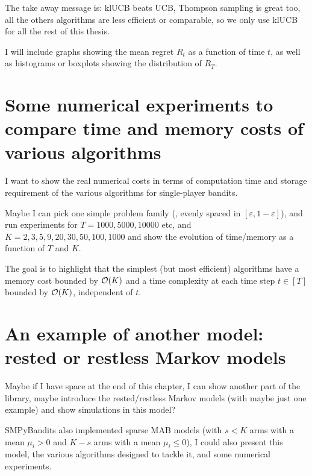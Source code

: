 The take away message is: klUCB beats UCB, Thompson sampling is great too, all the others algorithms are less efficient or comparable, so we only use klUCB for all the rest of this thesis.

I will include graphs showing the mean regret $R_t$ as a function of time $t$, as well as histograms or boxplots showing the distribution of $R_T$.


\section{Some numerical experiments to compare time and memory costs of various algorithms}
\label{sec:3:timeAndMemoryCosts}

I want to show the real numerical costs in terms of computation time and storage requirement of the various algorithms for single-player bandits.

Maybe I can pick one simple problem family (\eg, evenly spaced in $[\varepsilon,1-\varepsilon]$), and run experiments for $T=1000,5000,10000$ etc, and $K=2,3,5,9,20,30,50,100,1000$ and show the evolution of time/memory as a function of $T$ and $K$.

The goal is to highlight that the simplest (but most efficient) algorithms have a memory cost bounded by $\mathop{}\mathopen{}\mathcal{O}\mathopen{}\left(K\right)$ and a time complexity at each time step $t\in[T]$ bounded by $\mathop{}\mathopen{}\mathcal{O}\mathopen{}\left(K\right)$, independent of $t$.


\section{An example of another model: rested or restless Markov models}
\label{sec:3:markovModels}


Maybe if I have space at the end of this chapter, I can show another part of the library, maybe introduce the rested/restless Markov models (with maybe just one example) and show simulations in this model?

SMPyBandits also implemented sparse MAB models (with $s<K$ arms with a mean $\mu_i>0$ and $K-s$ arms with a mean $\mu_i \leq 0$), I could also present this model, the various algorithms designed to tackle it, and some numerical experiments.


